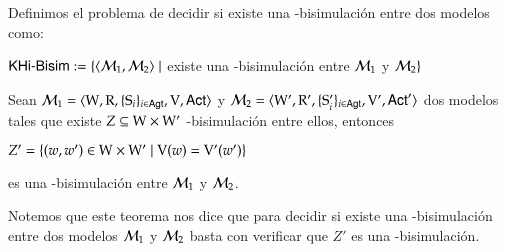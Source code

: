 \begin{definicion}
    Definimos el problema de decidir si existe una \KHilogic-bisimulación entre dos modelos como:
    \begin{center}
    $\rm\textsf{KHi-Bisim} := \{\langle \mathcal{M}_1,\mathcal{M}_2 \rangle \mid$ existe una \KHilogic-bisimulación entre $\mathcal{M}_1$ y $\mathcal{M}_2\}$
    \end{center}
\end{definicion}

\begin{lema}
    Sean $\mathcal{M}_1=\langle \mathrm{W},\mathrm{R},\{ \mathrm{S}_i \}_{i \in {\rm \sf Agt}},\mathrm{V},{\rm \sf Act} \rangle$ y $\mathcal{M}_2=\langle \mathrm{W}',\mathrm{R}',\{ \mathrm{S}_i' \}_{i \in {\rm \sf Agt}},\mathrm{V}',{\rm \sf Act}' \rangle$ dos modelos tales que existe $Z \subseteq \mathrm{W} \times \mathrm{W}'$ \KHilogic-bisimulación entre ellos, entonces

    \begin{center}
        $Z' = \{(w,w') \in \mathrm{W} \times \mathrm{W}' \mid \mathrm{V}(w) = \mathrm{V}'(w')\}$
    \end{center}
    es una \KHilogic-bisimulación entre $\mathcal{M}_1$ y $\mathcal{M}_2$.
\end{lema}

Notemos que este teorema nos dice que para decidir si existe una \KHilogic-bisimulación entre dos modelos $\mathcal{M}_1$ y $\mathcal{M}_2$ basta con verificar que $Z'$ es una \KHilogic-bisimulación.

